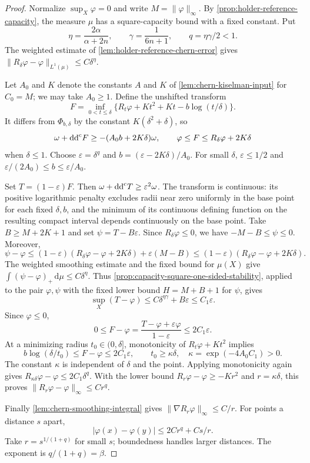 \begin{proof}
Normalize $\sup_X\varphi=0$ and write $M=\|\varphi\|_\infty$. By \cref{prop:holder-reference-capacity}, the measure $\mu$ has a square-capacity bound with a fixed constant. Put
\[
 \eta=\frac{2\alpha}{\alpha+2n},\qquad
 \gamma=\frac1{6n+1},\qquad q=\eta\gamma/2<1.
\]
The weighted estimate of \cref{lem:holder-reference-chern-error} gives $\|R_\delta\varphi-\varphi\|_{L^1(\mu)}\leq C\delta^\eta$.

Let $A_0$ and $K$ denote the constants $A$ and $K$ of \cref{lem:chern-kiselman-input} for $C_0=M$; we may take $A_0\geq1$. Define the unshifted transform
\[
 F=\inf_{0<t\leq\delta}
       \{R_t\varphi+Kt^2+Kt-b\log(t/\delta)\}.
\]
It differs from $\Phi_{b,\delta}$ by the constant $K(\delta^2+\delta)$, so
\[
 \omega+\mathrm{dd}^{\mathrm{c}} F\geq-(A_0b+2K\delta)\omega,
 \qquad \varphi\leq F\leq R_\delta\varphi+2K\delta
\]
when $\delta\leq1$. Choose $\varepsilon=\delta^q$ and $b=(\varepsilon-2K\delta)/A_0$. For small $\delta$, $\varepsilon\leq1/2$ and $\varepsilon/(2A_0)\leq b\leq\varepsilon/A_0$.

Set $T=(1-\varepsilon)F$. Then $\omega+\mathrm{dd}^{\mathrm{c}} T\geq\varepsilon^2\omega$. The transform is continuous: its positive logarithmic penalty excludes radii near zero uniformly in the base point for each fixed $\delta,b$, and the minimum of its continuous defining function on the resulting compact interval depends continuously on the base point. Take $B\geq M+2K+1$ and set $\psi=T-B\varepsilon$. Since $R_\delta\varphi\leq0$, we have $-M-B\leq\psi\leq0$. Moreover,
\[
 \psi-\varphi
 \leq(1-\varepsilon)(R_\delta\varphi-\varphi+2K\delta)
                         +\varepsilon(M-B)
 \leq(1-\varepsilon)(R_\delta\varphi-\varphi+2K\delta).
\]
The weighted smoothing estimate and the fixed bound for $\mu(X)$ give $\int(\psi-\varphi)_+\,\mathrm d\mu\leq C\delta^\eta$. Thus \cref{prop:capacity-square-one-sided-stability}, applied to the pair $\varphi,\psi$ with the fixed lower bound $H=M+B+1$ for $\psi$, gives
\[
 \sup_X(T-\varphi)\leq C\delta^{\eta\gamma}+B\varepsilon\leq C_1\varepsilon.
\]
Since $\varphi\leq0$,
\[
 0\leq F-\varphi
 =\frac{T-\varphi+\varepsilon\varphi}{1-\varepsilon}
 \leq2C_1\varepsilon.
\]
At a minimizing radius $t_0\in(0,\delta]$, monotonicity of $R_t\varphi+Kt^2$ implies
\[
 b\log(\delta/t_0)\leq F-\varphi\leq2C_1\varepsilon,
 \qquad t_0\geq\kappa\delta,
 \quad\kappa=\exp(-4A_0C_1)>0.
\]
The constant $\kappa$ is independent of $\delta$ and the point. Applying monotonicity again gives $R_{\kappa\delta}\varphi-\varphi\leq2C_1\delta^q$. With the lower bound $R_r\varphi-\varphi\geq-Kr^2$ and $r=\kappa\delta$, this proves $\|R_r\varphi-\varphi\|_\infty\leq Cr^q$.

Finally \cref{lem:chern-smoothing-integral} gives $\|\nabla R_r\varphi\|_\infty\leq C/r$. For points a distance $s$ apart,
\[
 |\varphi(x)-\varphi(y)|\leq2Cr^q+Cs/r.
\]
Take $r=s^{1/(1+q)}$ for small $s$; boundedness handles larger distances. The exponent is $q/(1+q)=\beta$.
\end{proof}

